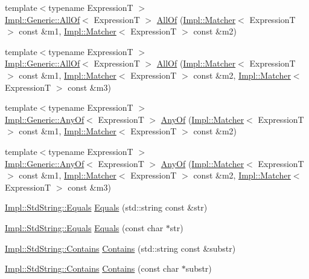 \begin{DoxyCompactItemize}
\item 
{\footnotesize template$<$typename Expression\+T $>$ }\\\hyperlink{a00001}{Impl\+::\+Generic\+::\+All\+Of}$<$ Expression\+T $>$ \hyperlink{a00121_aca6c1c17e137d989583c97f99705797a}{All\+Of} (\hyperlink{a00047}{Impl\+::\+Matcher}$<$ Expression\+T $>$ const \&m1, \hyperlink{a00047}{Impl\+::\+Matcher}$<$ Expression\+T $>$ const \&m2)
\item 
{\footnotesize template$<$typename Expression\+T $>$ }\\\hyperlink{a00001}{Impl\+::\+Generic\+::\+All\+Of}$<$ Expression\+T $>$ \hyperlink{a00121_a990366f7d62d10d9752ad7b24230def0}{All\+Of} (\hyperlink{a00047}{Impl\+::\+Matcher}$<$ Expression\+T $>$ const \&m1, \hyperlink{a00047}{Impl\+::\+Matcher}$<$ Expression\+T $>$ const \&m2, \hyperlink{a00047}{Impl\+::\+Matcher}$<$ Expression\+T $>$ const \&m3)
\item 
{\footnotesize template$<$typename Expression\+T $>$ }\\\hyperlink{a00002}{Impl\+::\+Generic\+::\+Any\+Of}$<$ Expression\+T $>$ \hyperlink{a00121_a9cb139c71b9e391d5fc017764695bf84}{Any\+Of} (\hyperlink{a00047}{Impl\+::\+Matcher}$<$ Expression\+T $>$ const \&m1, \hyperlink{a00047}{Impl\+::\+Matcher}$<$ Expression\+T $>$ const \&m2)
\item 
{\footnotesize template$<$typename Expression\+T $>$ }\\\hyperlink{a00002}{Impl\+::\+Generic\+::\+Any\+Of}$<$ Expression\+T $>$ \hyperlink{a00121_a8efb0e533db973b8aff1172fb908db02}{Any\+Of} (\hyperlink{a00047}{Impl\+::\+Matcher}$<$ Expression\+T $>$ const \&m1, \hyperlink{a00047}{Impl\+::\+Matcher}$<$ Expression\+T $>$ const \&m2, \hyperlink{a00047}{Impl\+::\+Matcher}$<$ Expression\+T $>$ const \&m3)
\item 
\hyperlink{a00017}{Impl\+::\+Std\+String\+::\+Equals} \hyperlink{a00121_acfe75df863ee6f2672c88c7d2e662b2e}{Equals} (std\+::string const \&str)
\item 
\hyperlink{a00017}{Impl\+::\+Std\+String\+::\+Equals} \hyperlink{a00121_aea3565202c7f6e73cc6c647dd813306e}{Equals} (const char $\ast$str)
\item 
\hyperlink{a00013}{Impl\+::\+Std\+String\+::\+Contains} \hyperlink{a00121_addaab3af75bf3f7fa39d915f3010f9b0}{Contains} (std\+::string const \&substr)
\item 
\hyperlink{a00013}{Impl\+::\+Std\+String\+::\+Contains} \hyperlink{a00121_a779538ff33cfd68deb0d9ebb2251b346}{Contains} (const char $\ast$substr)

\end{DoxyCompactItemize}
